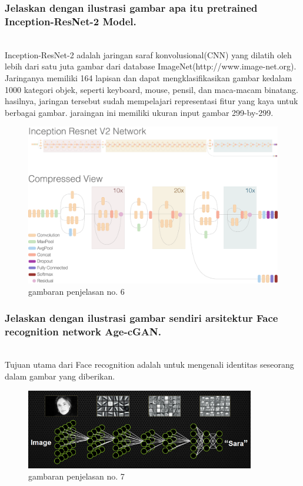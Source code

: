 \subsubsection{Jelaskan dengan ilustrasi gambar apa itu pretrained Inception-ResNet-2 Model.}
\hfill\\
Inception-ResNet-2 adalah jaringan saraf konvolusional(CNN) yang dilatih oleh lebih dari satu juta gambar dari database ImageNet(http://www.image-net.org). Jaringanya memiliki 164 lapisan dan dapat mengklasifikasikan gambar kedalam 1000 kategori objek, seperti keyboard, mouse, pensil, dan maca-macam binatang. hasilnya, jaringan tersebut sudah mempelajari representasi fitur yang kaya untuk berbagai gambar. jaraingan ini memiliki ukuran input gambar 299-by-299.

\begin{figure}[H]
	\centering
	\includegraphics[width=12cm]{figures/1174083/figures9/6.png}
	\caption{gambaran penjelasan no. 6}
\end{figure}

\subsubsection{Jelaskan dengan ilustrasi gambar sendiri arsitektur Face recognition network Age-cGAN.}
\hfill\\
Tujuan utama dari Face recognition adalah untuk mengenali identitas seseorang dalam gambar yang diberikan.

\begin{figure}[H]
	\centering
	\includegraphics[width=10cm]{figures/1174083/figures9/7.png}
	\caption{gambaran penjelasan no. 7}
\end{figure}

